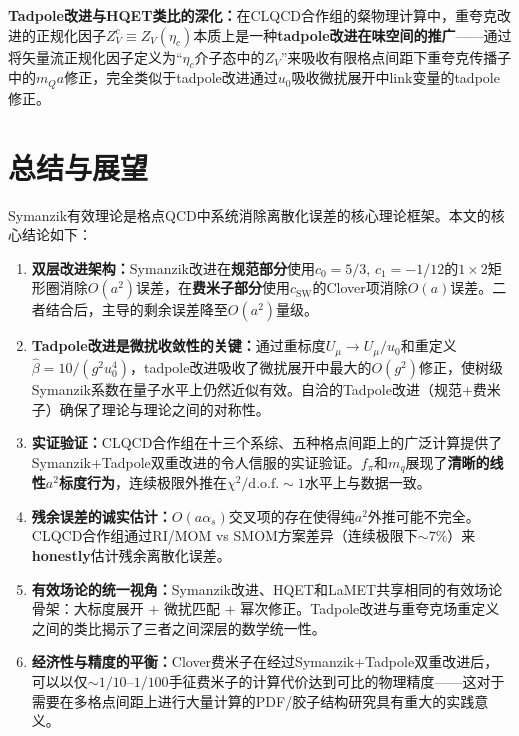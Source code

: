 \documentclass[12pt,a4paper]{ctexart}
\theoremstyle{definition}
\begin{document}
\textbf{Tadpole改进与HQET类比的深化：}在CLQCD合作组的粲物理计算\cite{CLQCD2024charm}中，重夸克改进的正规化因子$Z^c_V \equiv Z_V(\eta_c)$本质上是一种\textbf{tadpole改进在味空间的推广}——通过将矢量流正规化因子定义为``$\eta_c$介子态中的$Z_V$''来吸收有限格点间距下重夸克传播子中的$m_Q a$修正，完全类似于tadpole改进通过$u_0$吸收微扰展开中link变量的tadpole修正。

\section{总结与展望}

Symanzik有效理论是格点QCD中系统消除离散化误差的核心理论框架。本文的核心结论如下：

\begin{enumerate}
    \item \textbf{双层改进架构：}Symanzik改进在\textbf{规范部分}使用$c_0=5/3$, $c_1=-1/12$的$1\times2$矩形圈消除$O(a^2)$误差，在\textbf{费米子部分}使用$c_{\text{SW}}$的Clover项消除$O(a)$误差。二者结合后，主导的剩余误差降至$O(a^2)$量级\cite{CLQCD2025quark_mass}。

    \item \textbf{Tadpole改进是微扰收敛性的关键：}通过重标度$U_\mu \to U_\mu/u_0$和重定义$\hat{\beta} = 10/(g^2 u_0^4)$，tadpole改进吸收了微扰展开中最大的$O(g^2)$修正，使树级Symanzik系数在量子水平上仍然近似有效。自洽的Tadpole改进（规范+费米子）确保了理论与理论之间的对称性\cite{CLQCD2025quark_mass,CLQCD2024charm}。

    \item \textbf{实证验证：}CLQCD合作组在十三个系综、五种格点间距上的广泛计算提供了Symanzik+Tadpole双重改进的令人信服的实证验证。$f_\pi$和$m_q$展现了\textbf{清晰的线性$a^2$标度行为}，连续极限外推在$\chi^2/\text{d.o.f.} \sim 1$水平上与数据一致\cite{CLQCD2025quark_mass}。

    \item \textbf{残余误差的诚实估计：}$O(a\alpha_s)$交叉项的存在使得纯$a^2$外推可能不完全。CLQCD合作组通过RI/MOM vs SMOM方案差异（连续极限下$\sim 7\%$）来\textbf{honestly}估计残余离散化误差\cite{CLQCD2025quark_mass}。

    \item \textbf{有效场论的统一视角：}Symanzik改进、HQET和LaMET共享相同的有效场论骨架：大标度展开 + 微扰匹配 + 幂次修正。Tadpole改进与重夸克场重定义之间的类比揭示了三者之间深层的数学统一性\cite{Ji2014LaMET,CLQCD2024charm}。

    \item \textbf{经济性与精度的平衡：}Clover费米子在经过Symanzik+Tadpole双重改进后，可以以仅$\sim 1/10\text{--}1/100$手征费米子的计算代价达到可比的物理精度\cite{CLQCD2025quark_mass}——这对于需要在多格点间距上进行大量计算的PDF/胶子结构研究具有重大的实践意义。
\end{enumerate}
\end{document}
